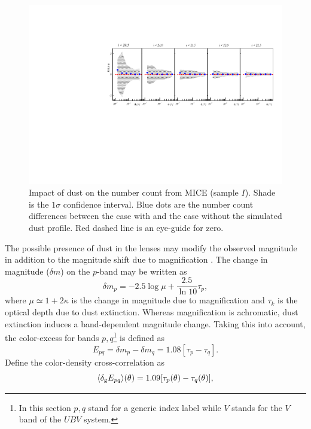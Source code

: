 \begin{figure}
\includegraphics[width=\textwidth,trim={0 2.3cm 0 3.5cm},clip]{./figures/mag_idust.pdf}
\caption{Impact of dust on the number count from MICE (sample $I$). Shade is the $1\sigma$ confidence interval. Blue dots are the number count differences between the case with and the case without the simulated dust profile. Red dashed line is an eye-guide for zero.}
\label{fig:micedust}
\end{figure}
The possible presence of dust in the lenses may modify the observed magnitude in addition to the magnitude shift due to magnification \cite{2010MNRAS.405.1025M}. The change in magnitude ($\delta m$) on the $p$-band may be written as
\begin{equation}
\delta m_p = -2.5\log\mu+\frac{2.5}{\ln10}\tau_p,
\end{equation}
where  $\mu\simeq1+2\kappa$ is the change in magnitude due to magnification and $\tau_k$ is the optical depth due to dust extinction. Whereas magnification is achromatic, dust extinction induces a band-dependent magnitude change. Taking this into account, the color-excess for bands $p,q$\footnote{In this section $p,q$ stand for a generic index label while $V$ stands for the $V$ band of the $UBV$ system.} is defined as
\begin{equation}
E_{pq} = \delta m_p-\delta m_q=1.08[\tau_p-\tau_q].
\end{equation}
Define the color-density cross-correlation as \cite{2010MNRAS.405.1025M}
\begin{equation}
\langle \delta_{\rm g}E_{pq}\rangle(\theta) = 1.09[\tau_p(\theta)-\tau_q(\theta)],
\end{equation}
